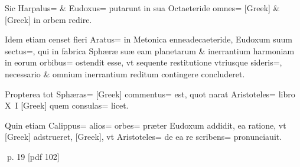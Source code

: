 \begin{parnumbers}
Sic Harpalus= \& Eudoxus= putarunt in sua Octaeteride omnes= [Greek] \& [Greek] in orbem redire.

Idem etiam censet fieri Aratus= in Metonica enneadecaeteride, Eudoxum suum sectus=, qui in fabrica Sphæræ suæ eam planetarum \& inerrantium harmoniam in eorum orbibus= ostendit esse, vt sequente  restitutione vtriusque sideris=, necessario \& omnium inerrantium reditum contingere concluderet.

Propterea tot Sphæras= [Greek] commentus= est, quot narat Aristoteles= libro X I [Greek] quem consulas= licet.

Quin etiam Calippus= alios= orbes= præter Eudoxum addidit, ea ratione, vt [Greek] adstrueret, [Greek], vt Aristoteles= de ea re scribens= pronunciauit.

\end{parnumbers}
\clearpage
p. 19 [pdf 102]

